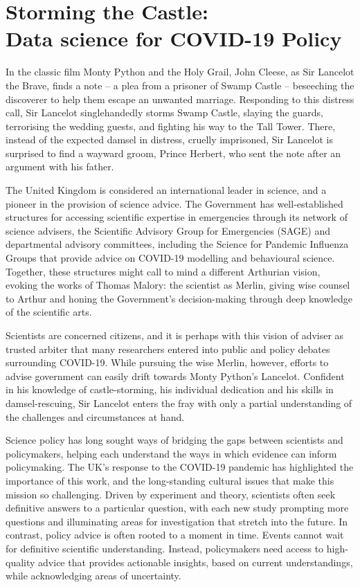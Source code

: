 \documentclass[a4paper]{caesar_book}
\let\oldchapter\chapter
\def\chapter{%
  \setcounter{footnote}{0}%
  \oldchapter
}
\begin{document}
\chapter{Storming the Castle:\\Data science for COVID-19 Policy}

In the classic film Monty Python and the Holy Grail, John Cleese, as Sir Lancelot the Brave, finds a note – a plea from a prisoner of Swamp Castle – beseeching the discoverer to help them escape an unwanted marriage. Responding to this distress call, Sir Lancelot singlehandedly storms Swamp Castle, slaying the guards, terrorising the wedding guests, and fighting his way to the Tall Tower. There, instead of the expected damsel in distress, cruelly imprisoned, Sir Lancelot is surprised to find a wayward groom, Prince Herbert, who sent the note after an argument with his father.

The United Kingdom is considered an international leader in science, and a pioneer in the provision of science advice. The Government has well-established structures for accessing scientific expertise in emergencies through its network of science advisers, the Scientific Advisory Group for Emergencies (SAGE) and departmental advisory committees, including the Science for Pandemic Influenza Groups that provide advice on COVID-19 modelling and behavioural science. Together, these structures might call to mind a different Arthurian vision, evoking the works of Thomas Malory: the scientist as Merlin, giving wise counsel to Arthur and honing the Government’s decision-making through deep knowledge of the scientific arts.

Scientists are concerned citizens, and it is perhaps with this vision of adviser as trusted arbiter that many researchers entered into public and policy debates surrounding COVID-19. While pursuing the wise Merlin, however, efforts to advise government can easily drift towards Monty Python’s Lancelot. Confident in his knowledge of castle-storming, his individual dedication and his skills in damsel-rescuing, Sir Lancelot enters the fray with only a partial understanding of the challenges and circumstances at hand.

Science policy has long sought ways of bridging the gaps between scientists and policymakers, helping each understand the ways in which evidence can inform policymaking. The UK’s response to the COVID-19 pandemic has highlighted the importance of this work, and the long-standing cultural issues that make this mission so challenging. Driven by experiment and theory, scientists often seek definitive answers to a particular question, with each new study prompting more questions and illuminating areas for investigation that stretch into the future. In contrast, policy advice is often rooted to a moment in time. Events cannot wait for definitive scientific understanding. Instead, policymakers need access to high-quality advice that provides actionable insights, based on current understandings, while acknowledging areas of uncertainty.
\end{document}
